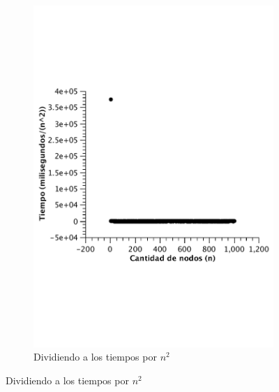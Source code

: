 \begin{figure}[H]
        \centering
         \begin{subfigure}[b]{0.5\textwidth}
                \includegraphics[width=\textwidth]{imagenes/completo-listas-3.pdf}
                \caption{Dividiendo a los tiempos por $n^2$}
        \end{subfigure}


\end{figure}
